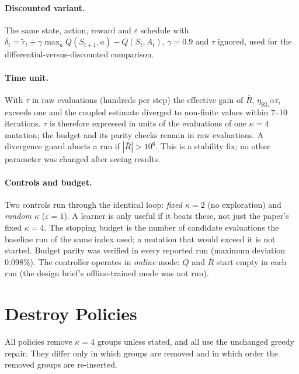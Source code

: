 \paragraph{Discounted variant.} The same state, action, reward and $\varepsilon$ schedule with $\delta_t=\tilde r_t+\gamma\max_aQ(S_{t+1},a)-Q(S_t,A_t)$, $\gamma=0.9$ and $\tau$ ignored, used for the differential-versus-discounted comparison.

\paragraph{Time unit.} With $\tau$ in raw evaluations (hundreds per step) the effective gain of $\bar R$, $\eta_{\mathrm{RL}}\alpha\tau$, exceeds one and the coupled estimate diverged to non-finite values within 7--10 iterations. $\tau$ is therefore expressed in units of the evaluations of one $\kappa=4$ mutation; the budget and its parity checks remain in raw evaluations. A divergence guard aborts a run if $|\bar R|>10^{6}$. This is a stability fix; no other parameter was changed after seeing results.

\paragraph{Controls and budget.} Two controls run through the identical loop: \emph{fixed $\kappa=2$} (no exploration) and \emph{random $\kappa$} ($\varepsilon=1$). A learner is only useful if it beats these, not just the paper's fixed $\kappa=4$. The stopping budget is the number of candidate evaluations the baseline run of the same index used; a mutation that would exceed it is not started. Budget parity was verified in every reported run (maximum deviation $0.098\%$). The controller operates in \emph{online} mode: $Q$ and $\bar R$ start empty in each run (the design brief's offline-trained mode was not run).


\section{Destroy Policies}\label{sec:policies}

All policies remove $\kappa=4$ groups unless stated, and all use the unchanged greedy repair. They differ only in which groups are removed and in which order the removed groups are re-inserted.

